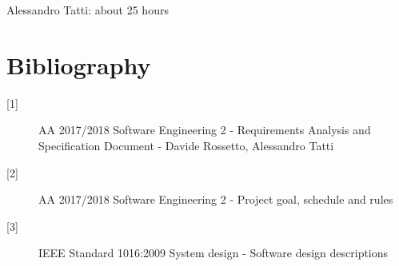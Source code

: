 \documentclass{article}
\begin{document}
	Alessandro Tatti: about 25 hours

	
	\section{Bibliography}
	
	\begin{description}
	\item [[1{]}] AA 2017/2018 Software Engineering 2 - Requirements Analysis and Specification Document - Davide Rossetto, Alessandro Tatti
	\item [[2{]}] AA 2017/2018 Software Engineering 2 - Project goal, schedule and rules
	\item [[3{]}] IEEE Standard 1016:2009 System design - Software design descriptions
	\end{description}
\end{document}
